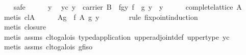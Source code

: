 \begin{isabellebody}
\ \ \isamarkupfalse%
\ safe\isanewline
\ \ \ \ \isamarkupfalse%
\ y\ \isamarkupfalse%
\ yc{}\ {}y\ {}\ carrier\ B{}\ \ fgy{}\ {}{}f\ {}\ g{}\ y\ {}\ y{}\isanewline
\ \ \ \ \isamarkupfalse%
\ {}complete{}lattice\ A{}\ \isamarkupfalse%
\ {}metis\ cl{}A{}\isanewline
\ \ \ \ \isamarkupfalse%
\ {}{}\isactrlbsub Ag\ {}\ f{}\ {}\isactrlbsub A\isactrlesub \ g\ y{}\isanewline
\ \ \ \ \ \ \isamarkupfalse%
\ {}rule\ fixpoint{}induction{}\isanewline
\ \ \ \ \ \ \isamarkupfalse%
\ {}metis\ closure{}{}\isanewline
\ \ \ \ \ \ \isamarkupfalse%
\ {}metis\ assms\ cl{}to{}galois\ typed{}application\ upper{}adjoint{}def\ upper{}type\ yc{}\isanewline
\ \ \ \ \ \ \isamarkupfalse%
\ {}metis\ assms\ cl{}to{}galois\ gf{}iso{}\isanewline
\ \ \ \ \ \ \isamarkupfalse%

\end{isabellebody}

